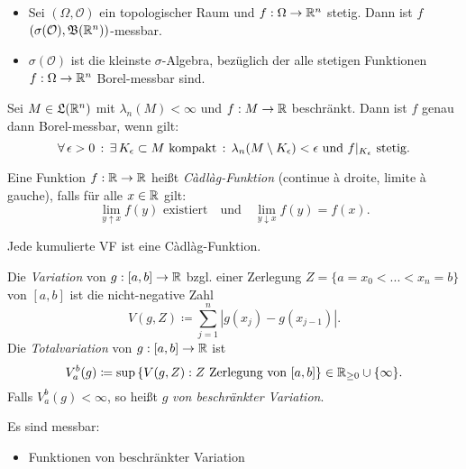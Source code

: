 \documentclass{cheat-sheet}
\newcommand{\LebAlg}{\mathfrak{L}} %
\newcommand{\Bor}{\mathfrak{B}} %
\begin{document}

\begin{satz}
  \begin{itemize}
    \item Sei $(\Omega, \mathcal{O})$ ein topologischer Raum und $f : \Omega \to \mathbb{R}^n$ stetig. Dann ist $f$ $(\sigma(\mathcal{O}), \Bor(\R^n))$-messbar. %
    \item $\sigma(\mathcal{O})$ ist die kleinste $\sigma$-Algebra, bezüglich der alle stetigen Funktionen $f : \Omega \to \mathbb{R}^n$ Borel-messbar sind.
  \end{itemize}
\end{satz}

\begin{satz}
  Sei $M \in \LebAlg(\R^n)$ mit $\lambda_n(M) < \infty$ und $f : M \to \mathbb{R}$ beschränkt. Dann ist $f$ genau dann Borel-messbar, wenn gilt:
  \[ \forall \, {\epsilon > 0} \,:\, \exists \, {K_\epsilon \subset M \text{ kompakt}} \,:\, \lambda_n(M \setminus K_\epsilon) < \epsilon \text{ und } f|_{K_\epsilon} \text{ stetig}. \]
\end{satz}

\begin{defn}
  Eine Funktion $f : \mathbb{R} \to \mathbb{R}$ heißt \emph{Càdlàg-Funktion} (continue à droite, limite à gauche), falls für alle $x \in \mathbb{R}$ gilt:
  \[ \lim_{y \uparrow x} f(y) \text{ existiert} \quad \text{und} \quad \lim_{y \downarrow x} f(y) = f(x). \]
\end{defn}

\begin{beobachtung}
  Jede kumulierte VF ist eine Càdlàg-Funktion.
\end{beobachtung}

\begin{defn}
Die \emph{Variation} von $g : [a, b] \to \mathbb{R}$ bzgl. einer Zerlegung $Z = \{ a = x_0 < ... < x_n = b \}$ von $[a, b]$ ist die nicht-negative Zahl
\[ V(g, Z) \coloneqq \sum_{j=1}^{n} |g(x_j) - g(x_{j-1})|. \]
Die \emph{Totalvariation} von $g : [a, b] \to \mathbb{R}$ ist
\[ V_a^b(g) \coloneqq \sup\left\{ V(g, Z) : Z \text{ Zerlegung von } [a, b] \right\} \in \mathbb{R}_{\ge 0} \cup \{ \infty \}. \]
Falls $V_a^b(g) < \infty$, so heißt $g$ \emph{von beschränkter Variation}.
\end{defn}

\begin{satz}
  Es sind messbar:
  \begin{itemize}
    \item Funktionen von beschränkter Variation
  \end{itemize}
\end{satz}
\end{document}
